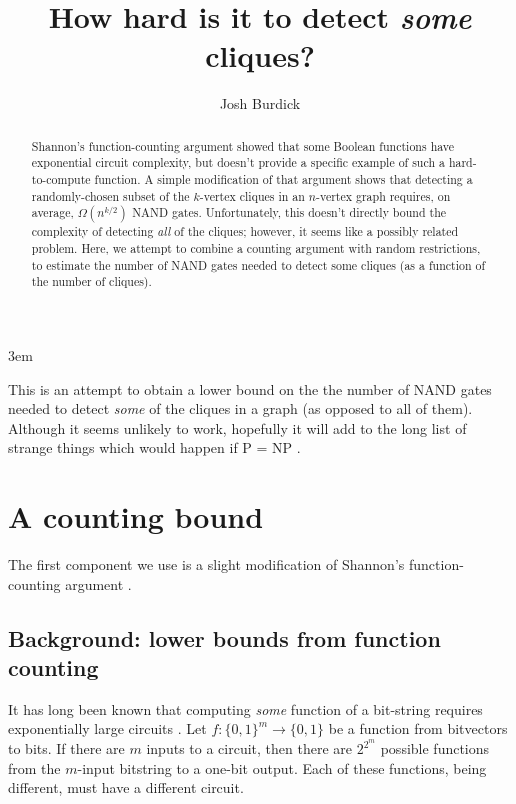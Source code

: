 \documentclass[12pt]{article}
\theoremstyle{definition}
\begin{document}
\emergencystretch 3em
\title{How hard is it to detect {\em some} cliques?}

\author{Josh Burdick}

\maketitle

\begin{abstract}
Shannon's function-counting argument
\cite{shannon_synthesis_1949} showed that some Boolean functions have
exponential circuit complexity, but doesn't provide a specific example
of such a hard-to-compute function. A simple modification of that argument
shows that detecting a randomly-chosen subset of the $k$-vertex cliques in an
$n$-vertex graph requires, on average, $\Omega(n^{k/2})$ NAND gates.
Unfortunately,
this doesn't directly bound the complexity of detecting {\em all} of the cliques;
however, it seems like a possibly related problem.
Here, we attempt to combine a counting argument with
random restrictions, to estimate the number
of NAND gates needed to detect some cliques (as a function
of the number of cliques).
\end{abstract}

\newpage

\tableofcontents

This is an attempt to obtain a lower bound on the the number of NAND gates
needed to detect {\em some} of the cliques in a graph (as opposed to
all of them).
Although it seems unlikely to work, hopefully
it will add to the long list of strange things which would happen
if P = NP \cite{fenner1996complexity}.

\section{A counting bound}
\label{countingBound}

The first component we use is a slight modification
of Shannon's function-counting argument
\cite{shannon_synthesis_1949}.

\subsection{Background: lower bounds from function counting}

It has long been known that computing {\em some} function of a bit-string
requires exponentially large circuits \cite{shannon_synthesis_1949}.
Let $f: \{0,1\}^m \rightarrow \{0,1\}$ be a function from bitvectors to bits.
If there are $m$ inputs to a circuit,
then there are $2^{2^m}$ possible functions from the $m$-input bitstring to
a one-bit output. Each of these functions, being different, must have a
different circuit.
\end{document}
